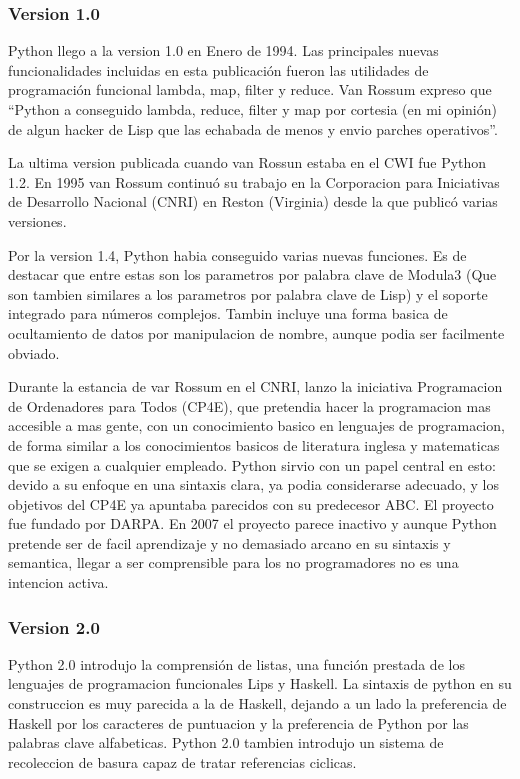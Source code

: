 \documentclass[a4paper,spanish,12pt]{book}
\begin{document}
\subsubsection{Version 1.0}

Python llego a la version 1.0 en Enero de 1994. Las principales nuevas funcionalidades incluidas en esta publicación fueron las utilidades de programación funcional lambda, map, filter y reduce. Van Rossum expreso que ``Python a conseguido lambda, reduce, filter y map por cortesia (en mi opinión) de algun hacker de Lisp que las echabada de menos y envio parches operativos''.

La ultima version publicada cuando van Rossun estaba en el CWI fue Python 1.2. En 1995 van Rossum continuó su trabajo en la Corporacion para Iniciativas de Desarrollo Nacional (CNRI) en Reston (Virginia) desde la que publicó varias versiones.

Por la version 1.4, Python habia conseguido varias nuevas funciones. Es de destacar que entre estas son los parametros por palabra clave de Modula3 (Que son tambien similares a los parametros por palabra clave de Lisp) y el soporte integrado para números complejos. Tambin incluye una forma basica de ocultamiento de datos por manipulacion de nombre, aunque podia ser facilmente obviado.

Durante la estancia de var Rossum en el CNRI, lanzo la iniciativa Programacion de Ordenadores para Todos (CP4E), que pretendia hacer la programacion mas accesible a mas gente, con un conocimiento basico en lenguajes de programacion, de forma similar a los conocimientos basicos de literatura inglesa y matematicas que se exigen a cualquier empleado. Python sirvio con un papel central en esto: devido a su enfoque en una sintaxis clara, ya podia considerarse adecuado, y los objetivos del CP4E ya apuntaba parecidos con su predecesor ABC. El proyecto fue fundado por DARPA. En 2007 el proyecto parece inactivo y aunque Python pretende ser de facil aprendizaje y no demasiado arcano en su sintaxis y semantica, llegar a ser comprensible para los no programadores no es una intencion activa.

\subsubsection{Version 2.0}

Python 2.0 introdujo la comprensión de listas, una función prestada de los lenguajes de programacion funcionales Lips y Haskell. La sintaxis de python en su construccion es muy parecida a la de Haskell, dejando a un lado la preferencia de Haskell por los caracteres de puntuacion y la preferencia de Python por las palabras clave alfabeticas. Python 2.0 tambien introdujo un sistema de recoleccion de basura capaz de tratar referencias ciclicas.
\end{document}
